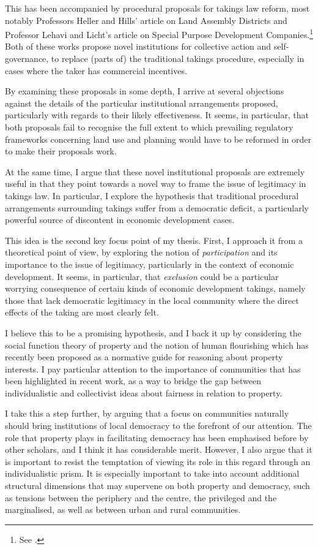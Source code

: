 \documentclass{book} %
\begin{document}
This has been accompanied by procedural proposals for takings law reform, most notably Professors Heller and Hills' article on Land Assembly Districts and Professor Lehavi and Licht's article on Special Purpose Development Companies.\footnote{See \cite{heller08,lehavi07}.} Both of these works propose novel institutions for collective action and self-governance, to replace (parts of) the traditional takings procedure, especially in cases where the taker has commercial incentives.

By examining these proposals in some depth, I arrive at several objections against the details of the particular institutional arrangements proposed, particularly with regards to their likely effectiveness. It seems, in particular, that both proposals fail to recognise the full extent to which prevailing regulatory frameworks concerning land use and planning would have to be reformed in order to make their proposals work.

At the same time, I argue that these novel institutional proposals are extremely useful in that they point towards a novel way to frame the issue of legitimacy in takings law. In particular, I explore the hypothesis that traditional procedural arrangements surrounding takings suffer from a democratic deficit, a particularly powerful source of discontent in economic development cases.

This idea is the second key focus point of my thesis. First, I approach it from a theoretical point of view, by exploring the notion of {\it participation} and its importance to the issue of legitimacy, particularly in the context of economic development. It seems, in particular, that {\it exclusion} could be a particular worrying consequence of certain kinds of economic development takings, namely those that lack democratic legitimacy in the local community where the direct effects of the taking are most clearly felt.

I believe this to be a promising hypothesis, and I back it up by considering the social function theory of property and the notion of human flourishing which has recently been proposed as a normative guide for reasoning about property interests. I pay particular attention to the importance of communities that has been highlighted in recent work, as a way to bridge the gap between individualistic and collectivist ideas about fairness in relation to property.

I take this a step further, by arguing that a focus on communities naturally should bring institutions of local democracy to the forefront of our attention. The role that property plays in facilitating democracy has been emphasised before by other scholars, and I think it has considerable merit. However, I also argue that it is important to resist the temptation of viewing its role in this regard through an individualistic prism. It is especially important to take into account additional structural dimensions that may supervene on both property and democracy, such as tensions between the periphery and the centre, the privileged and the marginalised, as well as between urban and rural communities.
\end{document}
